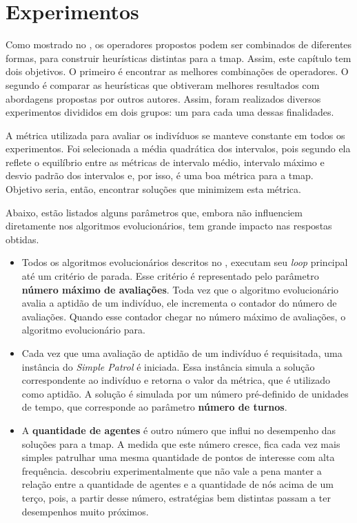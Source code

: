 \chapter{Experimentos}
\label{experimentos}

Como mostrado no , os operadores propostos podem ser 
combinados de diferentes formas, para construir heurísticas distintas para a 
\ac{tmap}. Assim, este capítulo tem dois objetivos. O primeiro é encontrar as 
melhores combinações de operadores. O segundo é comparar as heurísticas que 
obtiveram melhores resultados com abordagens propostas por outros autores. 
Assim, foram realizados diversos experimentos divididos em dois grupos: um para 
cada uma dessas finalidades.

A métrica utilizada para avaliar os indivíduos se manteve constante em todos 
os experimentos. Foi selecionada a média quadrática dos intervalos, pois segundo 
\citep{sampaiophd} ela reflete o equilíbrio entre as métricas de intervalo 
médio, intervalo máximo e desvio padrão dos intervalos e, por isso, é uma boa 
métrica para a \ac{tmap}. Objetivo seria, então, encontrar soluções que 
minimizem esta métrica.

Abaixo, estão listados alguns parâmetros que, embora não influenciem diretamente 
nos algoritmos evolucionários, tem grande impacto nas respostas obtidas.

\begin{itemize}
	\item Todos os algoritmos evolucionários descritos no , 
	executam seu \textit{loop} principal até um critério de parada. Esse 
	critério é representado pelo parâmetro \textbf{número máximo de avaliações}. 
	Toda vez que o algoritmo evolucionário avalia a aptidão de um indivíduo, ele 
	incrementa o contador do número de avaliações. Quando esse contador chegar 
	no número máximo de avaliações, o algoritmo evolucionário para.
	\item Cada vez que uma avaliação de aptidão de um indivíduo é requisitada, 
	uma instância do \textit{Simple Patrol} é iniciada. Essa instância simula 
	a solução correspondente ao indivíduo e retorna o valor da métrica, que é 
	utilizado como aptidão. A solução é simulada por um número pré-definido de 
	unidades de tempo, que corresponde ao parâmetro \textbf{número de turnos}.
	\item A \textbf{quantidade de agentes} é outro número que influi no 
	desempenho das soluções para a \ac{tmap}. A medida que este número cresce, 
	fica cada vez mais simples patrulhar uma mesma quantidade de pontos de 
	interesse com alta frequência. \citep{sampaiophd} descobriu 
	experimentalmente que não vale a pena manter a relação entre a quantidade de 
	agentes e a quantidade de nós acima de um terço, pois, a partir desse número, 
	estratégias bem distintas passam a ter desempenhos muito próximos.
\end{itemize}

